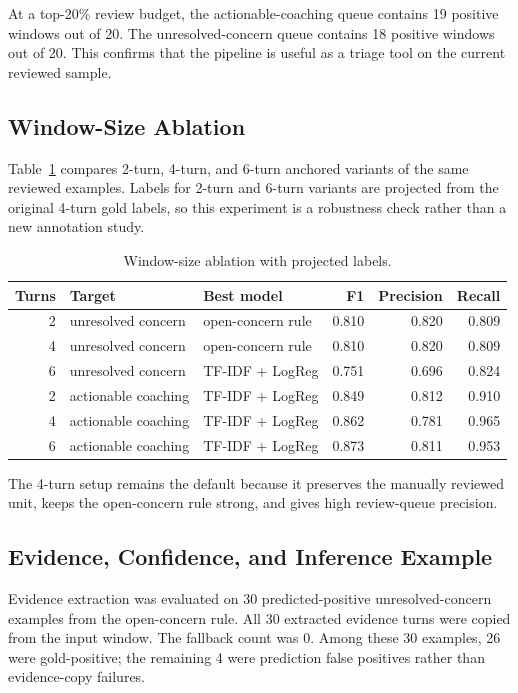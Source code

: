 \documentclass{article}
\begin{document}
At a top-20\% review budget, the actionable-coaching queue contains 19 positive windows out of 20. The unresolved-concern queue contains 18 positive windows out of 20. This confirms that the pipeline is useful as a triage tool on the current reviewed sample.

\subsection{Window-Size Ablation}
Table~\ref{tab:window-ablation} compares 2-turn, 4-turn, and 6-turn anchored variants of the same reviewed examples. Labels for 2-turn and 6-turn variants are projected from the original 4-turn gold labels, so this experiment is a robustness check rather than a new annotation study.

\begin{table}[!tbh]
    \centering
    \begin{tabular}{rllrrr}
        \toprule
        Turns & Target & Best model & F1 & Precision & Recall \\
        \midrule
        2 & unresolved concern & open-concern rule & 0.810 & 0.820 & 0.809 \\
        4 & unresolved concern & open-concern rule & 0.810 & 0.820 & 0.809 \\
        6 & unresolved concern & TF-IDF + LogReg & 0.751 & 0.696 & 0.824 \\
        2 & actionable coaching & TF-IDF + LogReg & 0.849 & 0.812 & 0.910 \\
        4 & actionable coaching & TF-IDF + LogReg & 0.862 & 0.781 & 0.965 \\
        6 & actionable coaching & TF-IDF + LogReg & 0.873 & 0.811 & 0.953 \\
        \bottomrule
    \end{tabular}
    \caption{Window-size ablation with projected labels.}
    \label{tab:window-ablation}
\end{table}

The 4-turn setup remains the default because it preserves the manually reviewed unit, keeps the open-concern rule strong, and gives high review-queue precision.

\subsection{Evidence, Confidence, and Inference Example}
Evidence extraction was evaluated on 30 predicted-positive unresolved-concern examples from the open-concern rule. All 30 extracted evidence turns were copied from the input window. The fallback count was 0. Among these 30 examples, 26 were gold-positive; the remaining 4 were prediction false positives rather than evidence-copy failures.
\end{document}
